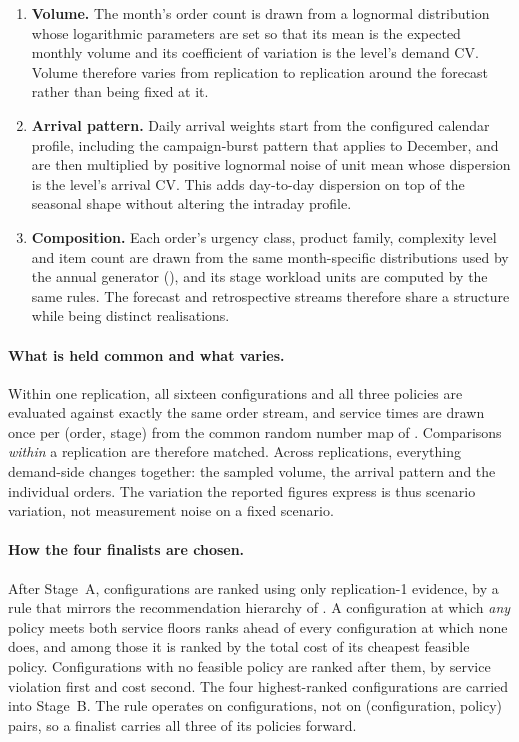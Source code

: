 \begin{enumerate}
  \item \textbf{Volume.} The month's order count is drawn from a lognormal distribution whose
        logarithmic parameters are set so that its mean is the expected monthly volume and its
        coefficient of variation is the level's demand CV. Volume therefore varies from
        replication to replication around the forecast rather than being fixed at it.
  \item \textbf{Arrival pattern.} Daily arrival weights start from the configured calendar
        profile, including the campaign-burst pattern that applies to December, and are then
        multiplied by positive lognormal noise of unit mean whose dispersion is the level's
        arrival CV. This adds day-to-day dispersion on top of the seasonal shape without
        altering the intraday profile.
  \item \textbf{Composition.} Each order's urgency class, product family, complexity level and
        item count are drawn from the same month-specific distributions used by the annual
        generator (), and its stage workload units are computed by the
        same rules. The forecast and retrospective streams therefore share a structure while
        being distinct realisations.
\end{enumerate}

\paragraph{What is held common and what varies.} Within one replication, all sixteen
configurations and all three policies are evaluated against exactly the same order stream, and
service times are drawn once per (order, stage) from the common random number map of
. Comparisons \emph{within} a replication are therefore matched. Across
replications, everything demand-side changes together: the sampled volume, the arrival pattern
and the individual orders. The variation the reported figures express is thus scenario
variation, not measurement noise on a fixed scenario.

\paragraph{How the four finalists are chosen.} After Stage~A, configurations are ranked using
only replication-1 evidence, by a rule that mirrors the recommendation hierarchy of
. A configuration at which \emph{any} policy meets both service floors
ranks ahead of every configuration at which none does, and among those it is ranked by the total
cost of its cheapest feasible policy. Configurations with no feasible policy are ranked after
them, by service violation first and cost second. The four highest-ranked configurations are
carried into Stage~B. The rule operates on configurations, not on (configuration, policy) pairs,
so a finalist carries all three of its policies forward.

